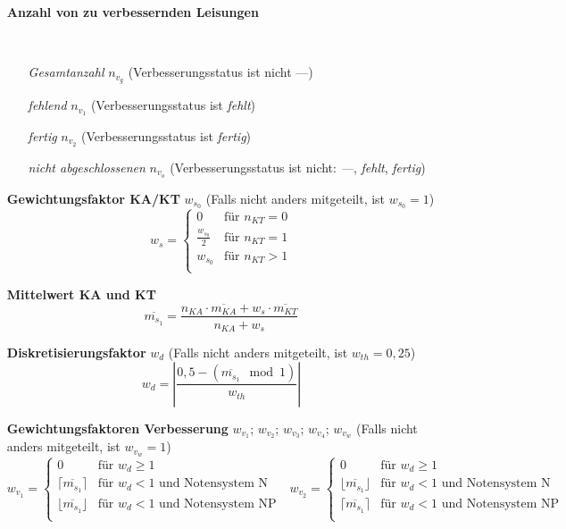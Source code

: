 \documentclass{article}
\begin{document}
\begin{enumerate}[label=\textbf{\textbullet}, align=left, leftmargin=*]
	\item[\textbf{Anzahl von zu verbessernden Leisungen}] { \scriptsize \mbox{} \
	\setlength{\columnsep}{-20pt}
	\begin{multicols}{2}
	\begin{enumerate}[label=\textbf{\textbullet}, align=left, leftmargin=*]
		\item[\textit{Gesamtanzahl}] $n_{v_g}$ (Verbesserungsstatus ist nicht \glqq ---\grqq{})
		\item[\textit{fehlend}] $n_{v_1}$ (Verbesserungsstatus ist \glqq \textit{fehlt}\grqq{})
		\item[\textit{fertig}] $n_{v_2}$ (Verbesserungsstatus ist \glqq \textit{fertig}\grqq{})
		\item[\textit{nicht abgeschlossenen}] $n_{v_o}$ (Verbesserungsstatus ist nicht: \glqq\textit{---}\grqq{}, \glqq\textit{fehlt}\grqq{}, \glqq\textit{fertig}\grqq{})
	\end{enumerate}
	\end{multicols}
	}
	\vspace*{-12pt}
	\item[\textbf{Gewichtungsfaktor KA/KT}] $w_{s_0}$ (Falls nicht anders mitgeteilt, ist $w_{s_0}=1$)
	\[
	w_s =
	\begin{cases}
		0 & \text{für }  n_{KT} = 0 \\
		\frac{w_{s_0}}{2} & \text{für }    n_{KT} = 1 \\
		w_{s_0} & \text{für }    n_{KT} > 1 \\
	\end{cases}
	\]	
	\item[\textbf{Mittelwert KA und KT}] 
	\[
	\overline{m_{s_1}} = \frac{ n_{KA} \cdot \overline{m_{KA}} + w_s \cdot \overline{m_{KT}} }{n_{KA} + w_s}
	\]
	\item[\textbf{Diskretisierungsfaktor}] $w_{d}$ (Falls nicht anders mitgeteilt, ist $w_{th}=0{,}25$) \cite{wikimodulo,wikibetrag}
	\[
	w_{d} = \left| \frac{0{,}5 - (\overline{m_{s_1}} \mod 1)}{w_{th}} \right|
	\]
	\item[\textbf{Gewichtungsfaktoren Verbesserung}] $w_{v_1}$; $w_{v_2}$; $w_{v_3}$; $w_{v_4}$; $w_{v_w}$ (Falls nicht anders mitgeteilt, ist $w_{v_w}=1$) \cite{wikigaussklammer} \\
	\[
	w_{v_1} =
	\begin{cases}
		0 & \text{für }  w_{d} \geq 1 \\
		\lceil \overline{m_{s_1}} \rceil & \text{für }    w_{d} < 1 \text{ und Notensystem N} \\
		\lfloor \overline{m_{s_1}} \rfloor & \text{für }    w_{d} < 1 \text{ und Notensystem NP} \\
	\end{cases}
	\,\,\,\,
	w_{v_2} =
	\begin{cases}
		0 & \text{für }  w_{d} \geq 1 \\
		\lfloor \overline{m_{s_1}} \rfloor & \text{für }    w_{d} < 1 \text{ und Notensystem N} \\
		\lceil \overline{m_{s_1}} \rceil & \text{für }    w_{d} < 1 \text{ und Notensystem NP} \\
	\end{cases}
	\]
	

\end{enumerate}
\end{document}
